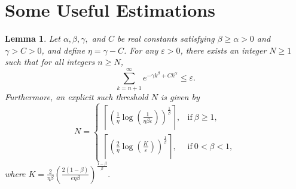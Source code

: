 \documentclass[a4paper,11pt,reqno]{amsart}
\theoremstyle{plain}
\newtheorem{lem}[thm]{Lemma}
\theoremstyle{mainthmstyle}
\theoremstyle{named}
\numberwithin{equation}{section}
\begin{document}


\appendix
\section{Some Useful Estimations}

\begin{lem} \label{threshold}
Let $\alpha, \beta, \gamma,$ and $C$ be real constants satisfying $\beta \ge \alpha > 0$ and $\gamma > C > 0$, and define $\eta = \gamma - C$. For any $\varepsilon > 0$, there exists an integer $N \ge 1$ such that for all integers $n \ge N$,
\begin{equation*}
    \sum_{k=n+1}^{\infty} e^{-\gamma k^\beta + C k^\alpha} \le \varepsilon.
\end{equation*}
Furthermore, an explicit such threshold $N$ is given by
\begin{equation*}
    N = \begin{cases}
    \left\lceil \left(\frac {1} {\eta} \log \left (\frac {1} {\eta \beta \varepsilon} \right) \right )^{\frac{1}{\beta}} \right \rceil, & \mathrm{if }\ \beta \ge 1, \\[12pt]
    \left\lceil \left( \frac{2}{\eta} \log \left (\frac {K} {\varepsilon} \right) \right)^{\frac{1}{\beta}} \right\rceil, & \mathrm{if }\ 0 < \beta < 1,
    \end{cases}
\end{equation*}
where $K = \frac{2}{\eta \beta} \left( \frac{2(1-\beta)}{e \eta \beta} \right)^{\frac{1-\beta}{\beta}}.$
\end{lem}
\end{document}
